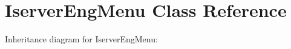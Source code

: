 \hypertarget{classIserverEngMenu}{}\section{Iserver\+Eng\+Menu Class Reference}
\label{classIserverEngMenu}


Inheritance diagram for Iserver\+Eng\+Menu\+:
